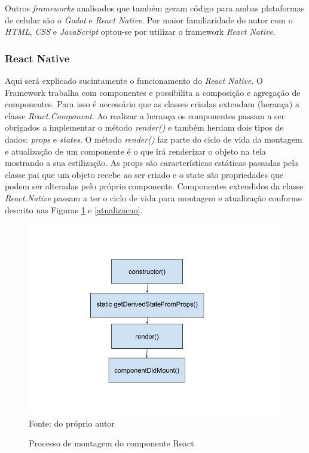 Outros \textit{frameworks} analisados que também geram código para ambas plataformas de celular são o \textit{Godot} e \textit{React Native}. Por maior familiaridade do autor com o \textit{HTML}, \textit{CSS} e \textit{JavaScript} optou-se por utilizar o framework \textit{React Native}.

\subsubsection[React Native]{React Native}
Aqui será explicado sucintamente o funcionamento do \textit{React Native}. O Framework trabalha com componentes e possibilita a composição e agregação de componentes. Para isso é necessário que as classes criadas extendam (herança) a classe \textit{React.Component}. Ao realizar a herança os componentes passam a ser obrigados a implementar o método \textit{render()} e também herdam dois tipos de dados: \textit{props} e \textit{states}. O método \textit{render()} faz parte do ciclo de vida da montagem e atualização de um componente é o que irá renderizar o objeto na tela mostrando a sua estilização. As props são características estáticas passadas pela classe pai que um objeto recebe ao ser criado e o state são propriedades que podem ser alteradas pelo próprio componente. Componentes extendidos da classe \textit{React.Native} passam a ter o ciclo de vida para montagem e atualização conforme descrito nas Figuras \ref{montagem} e \ref{atualizacao}.


\begin{figure}[H]
\centering
\caption{Processo de montagem do componente React}
\includegraphics[scale=0.7]{figuras/montagem.png}
\label{montagem}
\\
\small{Fonte: do próprio autor}
\end{figure}

